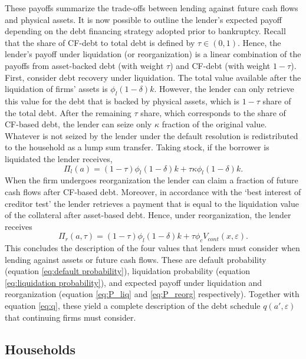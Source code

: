 \documentclass[12pt]{article}
\begin{document}
These payoffs summarize the trade-offs between lending against future cash flows and physical assets. It is now possible to outline the lender's expected payoff depending on the debt financing strategy adopted prior to bankruptcy. Recall that the share of CF-debt to total debt is defined by $\tau \in (0,1)$. Hence, the lender's payoff under liquidation (or reorganization) is a linear combination of the payoffs from asset-backed debt (with weight $\tau$) and CF-debt (with weight $1-\tau$). \vspace{3mm} \\
First, consider debt recovery under liquidation. The total value available after the liquidation of firms' assets is $\phi_l (1-\delta) k$. However, the lender can only retrieve this value for the debt that is backed by physical assets, which is $1-\tau$ share of the total debt. After the remaining $\tau$ share, which corresponds to the share of CF-based debt, the lender can seize only $\kappa$ fraction of the original value. Whatever is not seized by the lender under the default resolution is redistributed to the household as a lump sum transfer. Taking stock, if the borrower is liquidated the lender receives,
\begin{equation} \label{eq:P_liq} 
   \Pi_{l}(a) = (1-\tau) \phi_l (1-\delta) k +\tau \kappa \phi_l  (1-\delta) k. 
\end{equation}
When the firm undergoes reorganization the lender can claim a fraction of future cash flows after CF-based debt. Moreover, in accordance with the `best interest of creditor test' the lender retrieves a payment that is equal to the liquidation value of the collateral after asset-based debt. Hence, under reorganization, the lender receives
\begin{equation}  \label{eq:P_reorg}
   \Pi_{r}(a,\tau) = (1-\tau) \phi_l (1-\delta) k +\tau \phi_c V_{cont} (x, \varepsilon).
\end{equation}
This concludes the description of the four values that lenders must consider when lending against assets or future cash flows. These are default probability (equation \ref{eq:default probability}), liquidation probability (equation \ref{eq:liquidation probability}), and expected payoff under liquidation and reorganization (equation \ref{eq:P_liq} and \ref{eq:P_reorg} respectively). Together with equation \ref{eq:q}, these yield a complete description of the debt schedule $q(a', \varepsilon)$ that continuing firms must consider. 

\subsection{Households}\label{sec:hh}
\end{document}
